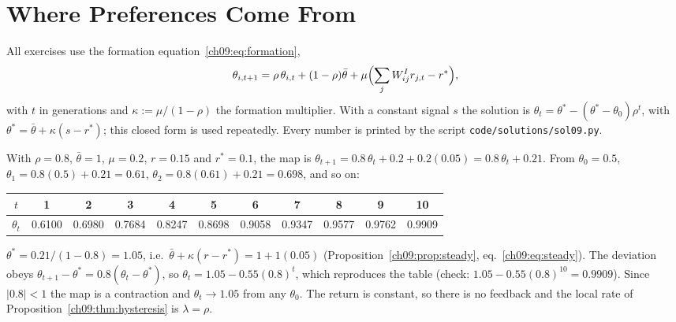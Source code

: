 \documentclass[../solutions_manual.tex]{subfiles}
\begin{document}
\ifSubfilesClassLoaded{\setcounter{chapter}{8}}{}%
\setcounter{chapter}{8}%
\chapter{Where Preferences Come From}\label{sol09}

All exercises use the formation equation~\eqref{ch09:eq:formation},
\[
\theta_{i,t+1} = \rho\,\theta_{i,t} + (1-\rho)\bar\theta + \mu\Bigl(\sum_jW^I_{ij}r_{j,t} - r^*\Bigr),
\]
with $t$ in generations and $\kappa := \mu/(1-\rho)$ the formation multiplier. With a constant signal $s$ the solution is $\theta_t = \theta^* - (\theta^* - \theta_0)\rho^t$, with $\theta^* = \bar\theta + \kappa(s - r^*)$; this closed form is used repeatedly. Every number is printed by the script \nolinkurl{code/solutions/sol09.py}.


 With $\rho = 0.8$, $\bar\theta = 1$, $\mu = 0.2$, $r = 0.15$ and $r^* = 0.1$, the map is $\theta_{t+1} = 0.8\,\theta_t + 0.2 + 0.2(0.05) = 0.8\,\theta_t + 0.21$. From $\theta_0 = 0.5$, $\theta_1 = 0.8(0.5) + 0.21 = 0.61$, $\theta_2 = 0.8(0.61) + 0.21 = 0.698$, and so on:
\begin{center}
\small
\setlength{\tabcolsep}{3pt}
\begin{tabular}{ccccccccccc}
\toprule
$t$ & 1 & 2 & 3 & 4 & 5 & 6 & 7 & 8 & 9 & 10 \\
\midrule
$\theta_t$ & 0.6100 & 0.6980 & 0.7684 & 0.8247 & 0.8698 & 0.9058 & 0.9347 & 0.9577 & 0.9762 & 0.9909 \\
\bottomrule
\end{tabular}
\end{center}

 $\theta^* = 0.21/(1 - 0.8) = 1.05$, i.e.\ $\bar\theta + \kappa(r - r^*) = 1 + 1(0.05)$ (Proposition~\ref{ch09:prop:steady}, eq.~\eqref{ch09:eq:steady}). The deviation obeys $\theta_{t+1} - \theta^* = 0.8(\theta_t - \theta^*)$, so $\theta_t = 1.05 - 0.55(0.8)^t$, which reproduces the table (check: $1.05 - 0.55(0.8)^{10} = 0.9909$). Since $|0.8| < 1$ the map is a contraction and $\theta_t \to 1.05$ from any $\theta_0$. The return is constant, so there is no feedback and the local rate of Proposition~\ref{ch09:thm:hysteresis} is $\lambda = \rho$.
\end{document}
